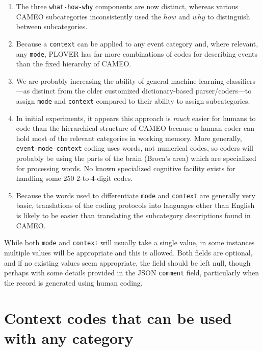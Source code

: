 \documentclass[11pt]{report}
\newcommand{\txt}[1]{\texttt{#1}}
\begin{document}
\begin{enumerate}

\item The three \texttt{what-how-why} components are now distinct, whereas various CAMEO subcategories inconsistently used the $how$ and $why$ to distinguish between subcategories.

\item Because a \txt{context} can be applied to any event category and, where relevant, any \txt{mode}, PLOVER has far more combinations of codes for describing events than the fixed hierarchy of CAMEO.

\item We are probably increasing the ability of general machine-learning classifiers---as distinct from the older customized dictionary-based parser/coders---to assign \txt{mode} and \txt{context} compared to their ability to assign subcategories.

\item In initial experiments, it appears this  approach is \textit{much} easier for humans to code than the hierarchical structure of CAMEO because a human coder can hold most of the relevant categories in working memory. More generally,  \txt{event-mode-context}  coding uses words, not numerical codes, so coders will probably be using the parts of the brain (Broca's area) which are specialized for processing words. No known specialized cognitive facility exists for handling some 250 2-to-4-digit codes.

\item Because the words used to differentiate \txt{mode} and \txt{context} are generally very basic, translations of the coding protocols into languages other than English is likely to be easier than translating the subcategory descriptions found in CAMEO.
\end{enumerate}

While both \txt{mode} and \txt{context} will usually take a single value, in some instances multiple values will be appropriate and this is allowed. Both fields are optional, and if no existing values seem appropriate, the field should be left null, though perhaps with some details provided in the JSON \texttt{comment} field, particularly when the record is generated using human coding.



\section{Context codes that can be used with any category}
\end{document}
